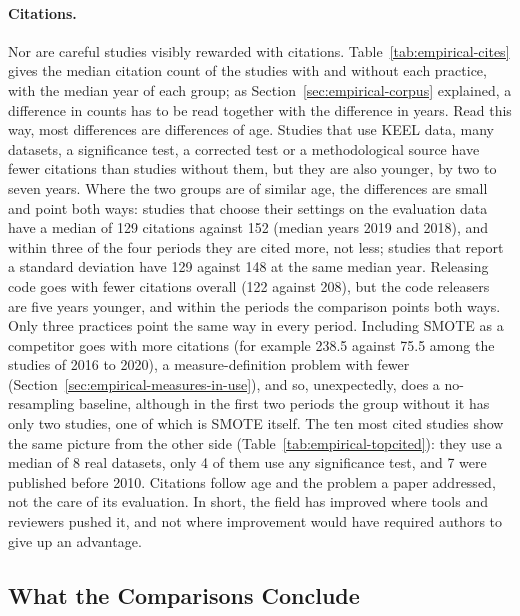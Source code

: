 \paragraph{Citations.} Nor are careful studies visibly rewarded with citations. Table~\ref{tab:empirical-cites} gives the median citation count of the studies with and without each practice, with the median year of each group; as Section~\ref{sec:empirical-corpus} explained, a difference in counts has to be read together with the difference in years. Read this way, most differences are differences of age. Studies that use KEEL data, many datasets, a significance test, a corrected test or a methodological source have fewer citations than studies without them, but they are also younger, by two to seven years. Where the two groups are of similar age, the differences are small and point both ways: studies that choose their settings on the evaluation data have a median of 129 citations against 152 (median years 2019 and 2018), and within three of the four periods they are cited more, not less; studies that report a standard deviation have 129 against 148 at the same median year. Releasing code goes with fewer citations overall (122 against 208), but the code releasers are five years younger, and within the periods the comparison points both ways. Only three practices point the same way in every period. Including SMOTE as a competitor goes with more citations (for example 238.5 against 75.5 among the studies of 2016 to 2020), a measure-definition problem with fewer (Section~\ref{sec:empirical-measures-in-use}), and so, unexpectedly, does a no-resampling baseline, although in the first two periods the group without it has only two studies, one of which is SMOTE itself. The ten most cited studies show the same picture from the other side (Table~\ref{tab:empirical-topcited}): they use a median of 8 real datasets, only 4 of them use any significance test, and 7 were published before 2010. Citations follow age and the problem a paper addressed, not the care of its evaluation. In short, the field has improved where tools and reviewers pushed it, and not where improvement would have required authors to give up an advantage.





\subsection{What the Comparisons Conclude}
\label{sec:empirical-outcomes}

